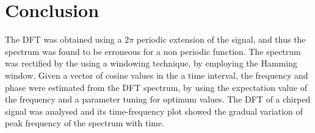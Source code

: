 \documentclass[11pt, a4paper, twoside]{article}
\begin{document}
\section{Conclusion}
    The DFT was obtained using a $2\pi$ periodic extension of the signal, and thus the spectrum was found to be erroneous for a non periodic function.  The spectrum was rectified by the using a windowing technique, by employing the Hamming window.  Given a vector of cosine values in the a time interval, the frequency and phase were estimated from the DFT spectrum, by using the expectation value of the frequency and a parameter tuning for optimum values.  The DFT of a chirped signal was analysed and its time-frequency plot showed the gradual variation of peak frequency of the spectrum with time.
\end{document}
